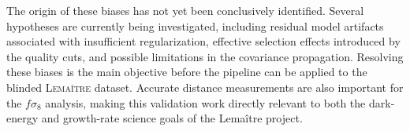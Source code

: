 The origin of these biases has not yet been conclusively identified. Several 
hypotheses are currently being investigated, including residual model artifacts 
associated with insufficient regularization, effective selection effects 
introduced by the quality cuts, and possible limitations in the covariance 
propagation. Resolving these biases is the main objective before the pipeline 
can be applied to the blinded \textsc{Lemaître} dataset. Accurate distance measurements 
are also important for the $f\sigma_8$ analysis, making this validation work 
directly relevant to both the dark-energy and growth-rate science goals of the 
Lemaître project. 


